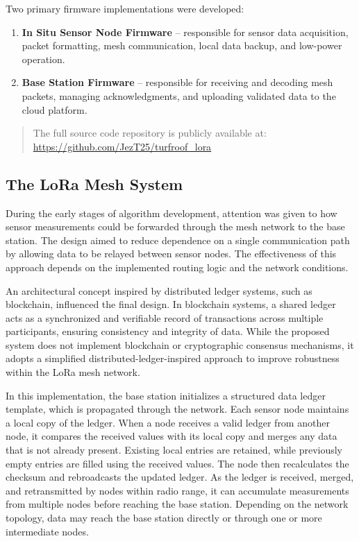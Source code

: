 Two primary firmware implementations were developed:


\begin{enumerate}
\def\labelenumi{\arabic{enumi}.}
\item
  \textbf{In Situ Sensor Node Firmware} -- responsible for sensor data
  acquisition, packet formatting, mesh communication, local data backup,
  and low-power operation.
\item
  \textbf{Base Station Firmware} -- responsible for receiving and
  decoding mesh packets, managing acknowledgments, and uploading
  validated data to the cloud platform.
\end{enumerate}

\begin{quote}
The full source code repository is publicly available at:\\
\url{https://github.com/JezT25/turfroof_lora}
\end{quote}

\subsection{The LoRa Mesh System}

During the early stages of algorithm development, attention was given to how sensor measurements could be forwarded through the mesh network to the base station. The design aimed to reduce dependence on a single communication path by allowing data to be relayed between sensor nodes. The effectiveness of this approach depends on the implemented routing logic and the network conditions.

An architectural concept inspired by distributed ledger systems, such as
blockchain, influenced the final design. In blockchain systems, a shared
ledger acts as a synchronized and verifiable record of transactions
across multiple participants, ensuring consistency and integrity of
data. While the proposed system does not implement blockchain or
cryptographic consensus mechanisms, it adopts a simplified
distributed-ledger-inspired approach to improve robustness within the
LoRa mesh network.

In this implementation, the base station initializes a structured data ledger template, which is propagated through the network. Each sensor node maintains a local copy of the ledger. When a node receives a valid ledger from another node, it compares the received values with its local copy and merges any data that is not already present. Existing local entries are retained, while previously empty entries are filled using the received values. The node then recalculates the checksum and rebroadcasts the updated ledger. As the ledger is received, merged, and retransmitted by nodes within radio range, it can accumulate measurements from multiple nodes before reaching the base station. Depending on the network topology, data may reach the base station directly or through one or more intermediate nodes.

